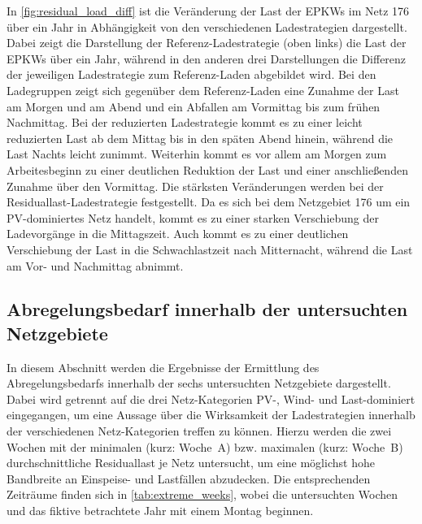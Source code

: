 In \autoref{fig:residual_load_diff} ist die Veränderung der Last der \glspl{EPKW} im Netz \num{176} über ein Jahr in Abhängigkeit von den verschiedenen Ladestrategien dargestellt.
Dabei zeigt die Darstellung der Referenz-Ladestrategie (oben links) die Last der \glspl{EPKW} über ein Jahr, während in den anderen drei Darstellungen die Differenz der jeweiligen Ladestrategie zum Referenz-Laden abgebildet wird.
Bei den Ladegruppen zeigt sich gegenüber dem Referenz-Laden eine Zunahme der Last am Morgen und am Abend und ein Abfallen am Vormittag bis zum frühen Nachmittag.
Bei der reduzierten Ladestrategie kommt es zu einer leicht reduzierten Last ab dem Mittag bis in den späten Abend hinein, während die Last Nachts leicht zunimmt.
Weiterhin kommt es vor allem am Morgen zum Arbeitesbeginn zu einer deutlichen Reduktion der Last und einer anschließenden Zunahme über den Vormittag.
Die stärksten Veränderungen werden bei der Residuallast-Ladestrategie festgestellt.
Da es sich bei dem Netzgebiet \num{176} um ein \gls{PV}-dominiertes Netz handelt, kommt es zu einer starken Verschiebung der Ladevorgänge in die Mittagszeit.
Auch kommt es zu einer deutlichen Verschiebung der Last in die Schwachlastzeit nach Mitternacht, während die Last am Vor- und Nachmittag abnimmt.





\subsection{Abregelungsbedarf innerhalb der untersuchten Netzgebiete}

In diesem Abschnitt werden die Ergebnisse der Ermittlung des Abregelungsbedarfs innerhalb der sechs untersuchten Netzgebiete dargestellt.
Dabei wird getrennt auf die drei Netz-Kategorien \gls{PV}-, Wind- und Last-dominiert eingegangen, um eine Aussage über die Wirksamkeit der Ladestrategien innerhalb der verschiedenen Netz-Kategorien treffen zu können.
Hierzu werden die zwei Wochen mit der minimalen (kurz: Woche~A) bzw. maximalen (kurz: Woche~B) durchschnittliche Residuallast je Netz untersucht, um eine möglichst hohe Bandbreite an Einspeise- und Lastfällen abzudecken.
Die entsprechenden Zeiträume finden sich in \autoref{tab:extreme_weeks}, wobei die untersuchten Wochen und das fiktive betrachtete Jahr mit einem Montag beginnen.

